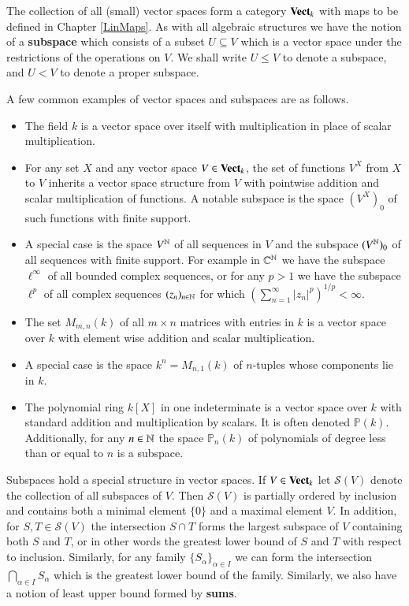 The collection of all (small) vector spaces form a category $\normalfont\textbf{Vect}_{k}$ with maps to be defined in Chapter \ref{LinMaps}. As with all algebraic structures we have the notion of a \textbf{subspace} which consists of a subset $U \subseteq V$ which is a vector space under the restrictions of the operations on $V$. We shall write $U \leq V$ to denote a subspace, and $U < V$ to denote a proper subspace.

\begin{example}
    A few common examples of vector spaces and subspaces are as follows. \begin{itemize}
        \item The field $k$ is a vector space over itself with multiplication in place of scalar multiplication.
        \item For any set $X$ and any vector space $V \in \normalfont\textbf{Vect}_{k}$, the set of functions $V^X$ from $X$ to $V$ inherits a vector space structure from $V$ with pointwise addition and scalar multiplication of functions. A notable subspace is the space $(V^X)_0$ of such functions with finite support.
        \item A special case is the space $V^{\mathbb N}$ of all sequences in $V$ and the subspace $(V^{\mathbb N})_0$ of all sequences with finite support. For example in $\mathbb C^{\mathbb N}$ we have the subspace $\ell^{\infty}$ of all bounded complex sequences, or for any $p > 1$ we have the subspace $\ell^p$ of all complex sequences $(z_n)_{n\in\mathbb N}$ for which $\left(\sum_{n=1}^{\infty}|z_n|^p\right)^{1/p} < \infty$.
        \item The set $M_{m,n}(k)$ of all $m\times n$ matrices with entries in $k$ is a vector space over $k$ with element wise addition and scalar multiplication.
        \item A special case is the space $k^n = M_{n,1}(k)$ of $n$-tuples whose components lie in $k$.
        \item The polynomial ring $k[X]$ in one indeterminate is a vector space over $k$ with standard addition and multiplication by scalars. It is often denoted $\mathbb{P}(k)$. Additionally, for any $n \in \mathbb N$ the space $\mathbb{P}_n(k)$ of polynomials of degree less than or equal to $n$ is a subspace.
    \end{itemize}
\end{example}

Subspaces hold a special structure in vector spaces. If $V \in \normalfont\textbf{Vect}_{k}$ let $\mathcal{S}(V)$ denote the collection of all subspaces of $V$. Then $\mathcal{S}(V)$ is partially ordered by inclusion and contains both a minimal element $\{0\}$ and a maximal element $V$. In addition, for $S,T \in \mathcal{S}(V)$ the intersection $S\cap T$ forms the largest subspace of $V$ containing both $S$ and $T$, or in other words the greatest lower bound of $S$ and $T$ with respect to inclusion. Similarly, for any family $\{S_{\alpha}\}_{\alpha \in I}$ we can form the intersection $\bigcap_{\alpha \in I}S_{\alpha}$ which is the greatest lower bound of the family. Similarly, we also have a notion of least upper bound formed by \textbf{sums}.

